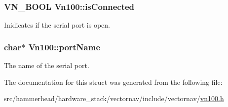\subsubsection[{\texorpdfstring{is\+Connected}{isConnected}}]{\setlength{\rightskip}{0pt plus 5cm}V\+N\+\_\+\+B\+O\+OL Vn100\+::is\+Connected}\hypertarget{structVn100_ae1d8b339e830f4d813119a20cf983a19}{}\label{structVn100_ae1d8b339e830f4d813119a20cf983a19}
Inidicates if the serial port is open. 
\subsubsection[{\texorpdfstring{port\+Name}{portName}}]{\setlength{\rightskip}{0pt plus 5cm}char$\ast$ Vn100\+::port\+Name}\hypertarget{structVn100_ac7e68c79da77f130a724748c5dadc123}{}\label{structVn100_ac7e68c79da77f130a724748c5dadc123}
The name of the serial port. 

The documentation for this struct was generated from the following file\+:\begin{DoxyCompactItemize}
\item 
src/hammerhead/hardware\+\_\+stack/vectornav/include/vectornav/\hyperlink{vn100_8h}{vn100.\+h}\end{DoxyCompactItemize}
